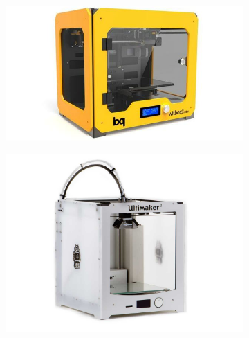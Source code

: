 \documentclass[11pt,a4paper]{article}
\begin{document}
\begin{figure}[H]
    \centering
    \begin{subfigure}[b]{0.3\textwidth}
        \includegraphics[width=\textwidth,cfbox=azul_marcos 4pt 0pt]{FOTOS/IMPRESORACERRADA1}
    \end{subfigure}
    \quad %
    \begin{subfigure}[b]{0.3\textwidth}
        \includegraphics[width=\textwidth,cfbox=azul_marcos 4pt 0pt]{FOTOS/IMPRESORACERRADA2}
    \end{subfigure}
    \quad %
    \begin{subfigure}[b]{0.3\textwidth}

\end{subfigure}
\end{figure}
\end{document}
